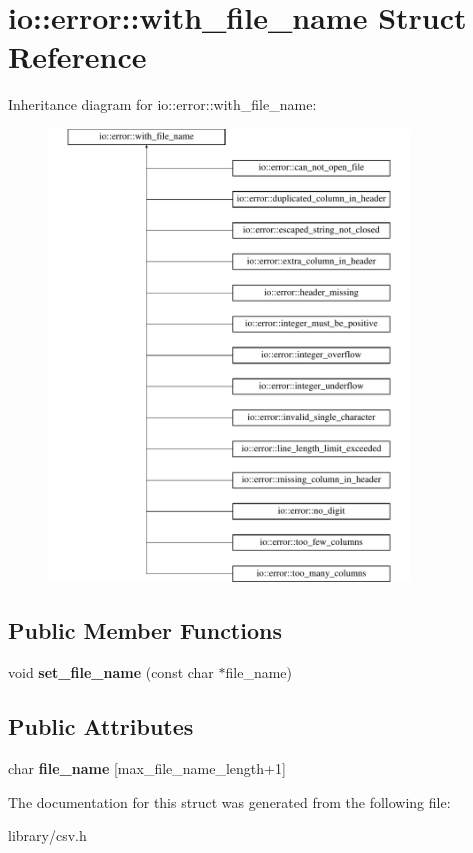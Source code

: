 \hypertarget{structio_1_1error_1_1with__file__name}{}\section{io\+:\+:error\+:\+:with\+\_\+file\+\_\+name Struct Reference}
\label{structio_1_1error_1_1with__file__name}
Inheritance diagram for io\+:\+:error\+:\+:with\+\_\+file\+\_\+name\+:\begin{figure}[H]
\begin{center}
\leavevmode
\includegraphics[height=12.000000cm]{structio_1_1error_1_1with__file__name}
\end{center}
\end{figure}
\subsection*{Public Member Functions}
\begin{DoxyCompactItemize}
\item 
\mbox{\label{structio_1_1error_1_1with__file__name_ae765de62778c989d4658b4efe2995390}} 
void {\bfseries set\+\_\+file\+\_\+name} (const char $\ast$file\+\_\+name)
\end{DoxyCompactItemize}
\subsection*{Public Attributes}
\begin{DoxyCompactItemize}
\item 
\mbox{\label{structio_1_1error_1_1with__file__name_ac957d5590a8b95517b74eb5bf373a424}} 
char {\bfseries file\+\_\+name} \mbox{[}max\+\_\+file\+\_\+name\+\_\+length+1\mbox{]}
\end{DoxyCompactItemize}


The documentation for this struct was generated from the following file\+:\begin{DoxyCompactItemize}
\item 
library/csv.\+h\end{DoxyCompactItemize}
